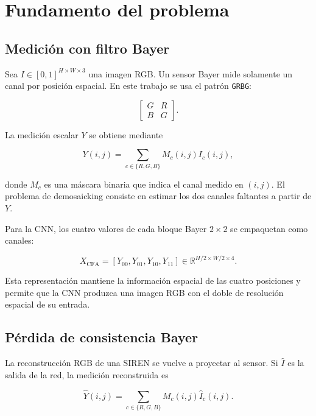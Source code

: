 \documentclass[11pt,a4paper]{article}
\begin{document}
\section{Fundamento del problema}

\subsection{Medición con filtro Bayer}

Sea $I\in[0,1]^{H\times W\times3}$ una imagen RGB. Un sensor Bayer mide solamente un canal por posición espacial. En este trabajo se usa el patrón \texttt{GRBG}:

\begin{equation}
    \begin{bmatrix}
        G & R\\
        B & G
    \end{bmatrix}.
    \label{eq:grbg}
\end{equation}

La medición escalar $Y$ se obtiene mediante

\begin{equation}
    Y(i,j)=\sum_{c\in\{R,G,B\}}M_c(i,j)I_c(i,j),
    \label{eq:medicion}
\end{equation}

donde $M_c$ es una máscara binaria que indica el canal medido en $(i,j)$. El problema de demosaicking consiste en estimar los dos canales faltantes a partir de $Y$.

Para la CNN, los cuatro valores de cada bloque Bayer $2\times2$ se empaquetan como canales:

\begin{equation}
    X_{\mathrm{CFA}}=[Y_{00},Y_{01},Y_{10},Y_{11}]
    \in\mathbb{R}^{H/2\times W/2\times4}.
    \label{eq:packed}
\end{equation}

Esta representación mantiene la información espacial de las cuatro posiciones y permite que la CNN produzca una imagen RGB con el doble de resolución espacial de su entrada.

\subsection{Pérdida de consistencia Bayer}

La reconstrucción RGB de una SIREN se vuelve a proyectar al sensor. Si $\hat I$ es la salida de la red, la medición reconstruida es

\begin{equation}
    \hat Y(i,j)=\sum_{c\in\{R,G,B\}}M_c(i,j)\hat I_c(i,j).
    \label{eq:reproyeccion}
\end{equation}
\end{document}
